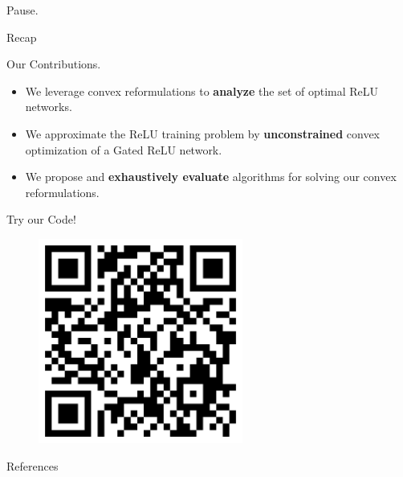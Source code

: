 \documentclass[usenames,dvipsnames,mathserif,notheorems]{beamer}
\begin{document}

\begin{frame}{}
	\begin{center}
		\huge Pause.
	\end{center}
\end{frame}

\begin{frame}{Recap}
	\begin{center}
		\huge   Our Contributions.
	\end{center}

	\vspace{2em}
	\pause
	{ \large
		\begin{itemize}
			\item We leverage convex reformulations to \textbf{analyze} the set
			      of optimal ReLU networks.
			      \pause
			      \vspace{0.5em}

			\item We approximate the ReLU training problem by \textbf{unconstrained}
			      convex optimization of a Gated ReLU network.\pause
			      \vspace{0.5em}

			\item We propose and \textbf{exhaustively evaluate} algorithms for solving
			      our convex reformulations.
		\end{itemize}
	}

\end{frame}




\begin{frame}{}
	\begin{center}
		\huge Try our Code!
	\end{center}

	\begin{figure}[]
		\centering
		\includegraphics[width=0.6\textwidth]{assets/github.png}
	\end{figure}
\end{frame}

\begin{frame}[allowframebreaks]{References}
	\printbibliography[]
\end{frame}
\end{document}
